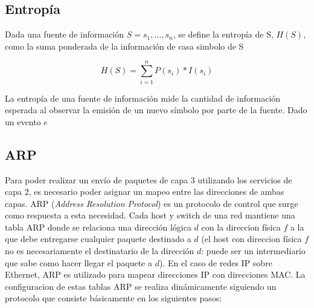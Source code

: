 \subsection{Entropía}

Dada una fuente de información $S={s_{1},...,s_{n}}$, se define la entropía de S, $H(S)$, como la suma ponderada de la información de casa simbolo de S

$$H(S)=\sum^{n}_{i=1}{P(s_{i})*I(s_{i})}$$

La entropía de una fuente de información mide la cantidad de información esperada al observar la emisión de un nuevo símbolo por parte de la fuente. Dado un evento $e$

\subsection{ARP}

Para poder realizar un envío de paquetes de capa 3 utilizando los servicios de capa 2, es necesario poder asignar un mapeo entre las direcciones de ambas capas. ARP (\textsl{Address Resolution Protocol}) es un protocolo de control que surge como respuesta a esta necesidad.  Cada host y switch de una red mantiene una tabla ARP donde se relaciona una dirección lógica $d$ con la direccion física $f$ a la que debe entregarse cualquier paquete destinado a $d$ (el host con direccion física $f$ no es necesariamente el destinatario de la dirección $d$: puede ser un intermediario que sabe como hacer llegar el paquete a $d$). En el caso de redes IP sobre Ethernet, ARP es utilizado para mapear direcciones IP con direcciones MAC. 
La configuracion de estas tablas ARP se realiza dinámicamente siguiendo un protocolo que consiste básicamente en los siguientes pasos:

